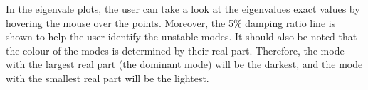 In the eigenvale plots, the user can take a look at the eigenvalues exact values
by hovering the mouse over the points. Moreover, the 5\% damping ratio line is shown to help the user identify
the unstable modes. It should also be noted that the colour of the modes is determined by their real part.
 Therefore, the mode with the largest real part (the dominant mode) will be the darkest, 
 and the mode with the smallest real part will be the lightest.








